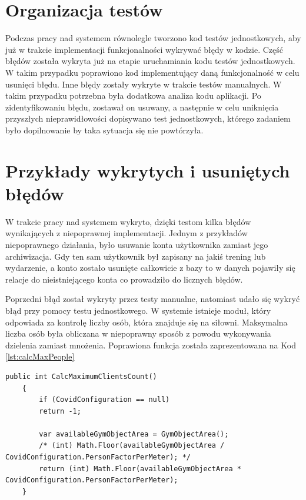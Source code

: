 \documentclass[a4paper,twoside,12pt]{book}
\begin{document}
{\section{Organizacja testów}
Podczas pracy nad systemem równolegle tworzono kod testów jednostkowych, aby już w trakcie implementacji funkcjonalności wykrywać błędy w kodzie. Część błędów została wykryta już na etapie uruchamiania kodu testów jednostkowych. W takim przypadku poprawiono kod implementujący daną funkcjonalność w celu usunięci błędu. Inne błędy zostały wykryte w trakcie testów manualnych. W takim przypadku potrzebna była dodatkowa analiza kodu aplikacji. Po zidentyfikowaniu błędu, zostawał on usuwany, a następnie w celu uniknięcia przyszłych nieprawidłowości dopisywano test jednostkowych, którego zadaniem było dopilnowanie by taka sytuacja się nie powtórzyła.

\section{Przykłady wykrytych i usuniętych błędów}
W trakcie pracy nad systemem wykryto, dzięki testom kilka błędów wynikających z niepoprawnej implementacji. Jednym z przykładów niepoprawnego działania, było usuwanie konta użytkownika zamiast jego archiwizacja. Gdy ten sam użytkownik był zapisany na jakiś trening lub wydarzenie, a konto zostało usunięte całkowicie z bazy to w danych pojawiły się relacje do nieistniejącego konta co prowadziło do licznych błędów.

Poprzedni błąd został wykryty przez testy manualne, natomiast udało się wykryć błąd przy pomocy testu jednostkowego. W systemie istnieje moduł, który odpowiada za kontrolę liczby osób, która znajduje się na siłowni. Maksymalna liczba osób była obliczana w niepoprawny sposób z powodu wykonywania dzielenia zamiast mnożenia. Poprawiona funkcja została zaprezentowana na Kod \ref{lst:calcMaxPeople}
\begin{lstlisting}[caption={Metoda licząca jaka jest maksymalna liczba osób, która znajduje się w jednej chwili w obiekcie siłowni}, label={lst:calcMaxPeople}]
	public int CalcMaximumClientsCount()
	{
		if (CovidConfiguration == null)
		return -1;
		
		var availableGymObjectArea = GymObjectArea();
		/* (int) Math.Floor(availableGymObjectArea / CovidConfiguration.PersonFactorPerMeter); */
		return (int) Math.Floor(availableGymObjectArea * CovidConfiguration.PersonFactorPerMeter);
	}
\end{lstlisting}

}
\end{document}
